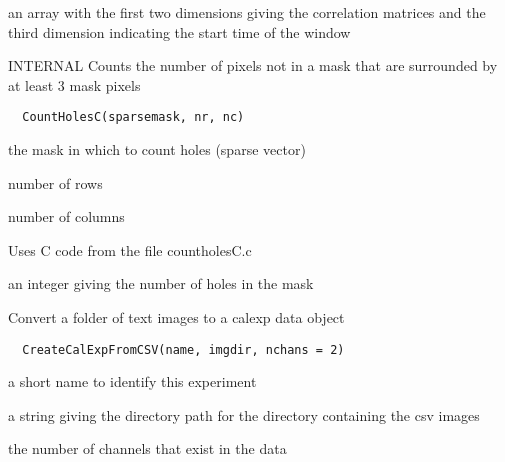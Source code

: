 \documentclass[a4paper]{book}
\begin{document}
%
\begin{Value}
an array with the first two dimensions giving the
correlation matrices and the third dimension indicating
the start time of the window
\end{Value}
%
\begin{Description}\relax
INTERNAL Counts the number of pixels not in a mask that
are surrounded by at least 3 mask pixels
\end{Description}
%
\begin{Usage}
\begin{verbatim}
  CountHolesC(sparsemask, nr, nc)
\end{verbatim}
\end{Usage}
%
\begin{Arguments}
\begin{ldescription}
\item[\code{sparsemask}] the mask in which to count holes
(sparse vector)

\item[\code{nr}] number of rows

\item[\code{nc}] number of columns
\end{ldescription}
\end{Arguments}
%
\begin{Details}\relax
Uses C code from the file countholesC.c
\end{Details}
%
\begin{Value}
an integer giving the number of holes in the mask
\end{Value}
%
\begin{Description}\relax
Convert a folder of text images to a calexp data object
\end{Description}
%
\begin{Usage}
\begin{verbatim}
  CreateCalExpFromCSV(name, imgdir, nchans = 2)
\end{verbatim}
\end{Usage}
%
\begin{Arguments}
\begin{ldescription}
\item[\code{name}] a short name to identify this experiment

\item[\code{imgdir}] a string giving the directory path for the
directory containing the csv images

\item[\code{nchans}] the number of channels that exist in the
data
\end{ldescription}
\end{Arguments}
\end{document}
